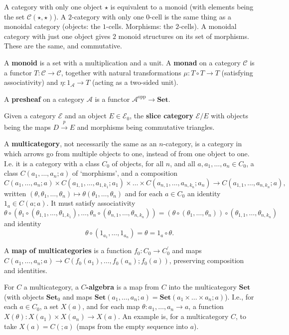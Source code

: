 \documentclass{amsbook}
\newcommand{\Catc}[1]{\mathcal{#1}}
\newcommand{\CC}{\Catc{C}}
\newcommand{\EE}{\Catc{E}}
\newcommand{\Catb}[1]{\mathbf{#1}}
\newcommand{\SET}{\Catb{Set}}
\newcommand{\Ob}[1]{{#1}_0}
\newcommand{\Hom}[3]{{#1}(#2,#3)}
\begin{document}
  A category with only one object $ \star $ is equivalent to a monoid (with elements being the set $ \Hom{\CC}{\star}{\star} $). A $ 2 $-category with only one $ 0 $-cell is the same thing as a monoidal category (objects: the $ 1 $-cells. Morphisms: the $ 2 $-cells). A monoidal category with just one object gives $ 2 $ monoid structures on its set of morphisms. These are the same, and commutative.

  A \textbf{monoid} is a set with a multiplication and a unit. A \textbf{monad} on a category $ \CC $ is a functor $ T: \CC \to \CC $, together with natural transformations $ \mu : T \circ T \to T $ (satisfying associativity) and $ \eta : 1_{\mathcal A} \to T $ (acting as a two-sided unit).

  A \textbf{presheaf} on a category $ \mathcal A $ is a functor $ \mathcal A^{\mathop{opp}} \to \mathbf{Set} $.

  Given a category $ \mathcal E $ and an object $ E \in \Ob \EE $, the \textbf{slice category} $ \mathcal E / E $ with objects being the maps $ D \xrightarrow{p} E $ and morphisms being commutative triangles.

  A \textbf{multicategory}, not necessarily the same as an $ n $-category, is a category in which arrows go from multiple objects to one, instead of from one object to one. I.e. it is a category with a class $ C_0 $ of objects, for all $ n $, and all $ a, a_1, \dots, a_n \in C_0 $, a class $ C(a_1, \dots, a_n; a) $ of `morphisms', and a composition 
  \[ C(a_1, \dots, a_n; a) \times C(a_{1, 1}, \dots, a_{1, k_1}; a_1) \times \dots \times C(a_{n, 1}, \dots, a_{n, k_n}; a_n) \to C(a_{1, 1}, \dots, a_{n, k_n}; a), \]
  written $ (\theta, \theta_1, \dots, \theta_n) \mapsto \theta (\theta_1, \dots, \theta_n) $ and for each $ a \in C_0 $ an identity $ 1_a \in C(a; a) $. It must satisfy associativity
  \[ \theta \circ(\theta_1 \circ(\theta_{1, 1}, \dots, \theta_{1, k_1}), \dots, \theta_n \circ (\theta_{n, 1}, \dots, \theta_{n, k_n})) = (\theta \circ (\theta_1, \dots, \theta_n)) \circ (\theta_{1, 1}, \dots, \theta_{n, k_n}) \]
  and identity
  \[ \theta \circ (1_{a_1}, \dots, 1_{a_n}) = \theta = 1_a \circ \theta. \]

  A \textbf{map of multicategories} is a function $ f_0: C_0 \to C_0^\prime $ and maps $ C(a_1, \dots, a_n; a) \to C(f_0(a_1), \dots, f_0(a_n); f_0(a)) $, preserving composition and identities.

  For $ C $ a multicategory, a \textbf{$ C $-algebra} is a map from $ C $ into the multicategory $ \mathbf{Set} $ (with objects $ \SET_0 $ and maps $ \SET(a_1, \dots, a_n; a) = \SET(a_1 \times \dots \times a_n ; a) $). I.e., for each $ a \in C_0 $, a set $ X(a) $, and for each map $ \theta: a_1, \dots, a_n \to a $, a function $ X(\theta): X(a_1) \times X(a_n) \to X(a) $. An example is, for a multicategory $ C $, to take $ X(a) = C(; a) $ (maps from the empty sequence into $ a $).
\end{document}
